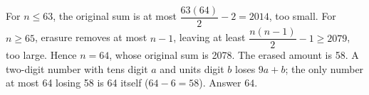 For $n\le63$, the original sum is at most $\dfrac{63(64)}{2}-2=2014$, too small. For $n\ge65$, erasure removes at most $n-1$, leaving at least $\dfrac{n(n-1)}{2}-1\ge2079$, too large. Hence $n=64$, whose original sum is 2078. The erased amount is 58. A two-digit number with tens digit $a$ and units digit $b$ loses $9a+b$; the only number at most 64 losing 58 is 64 itself ($64-6=58$). Answer $\boxed{64}$.
